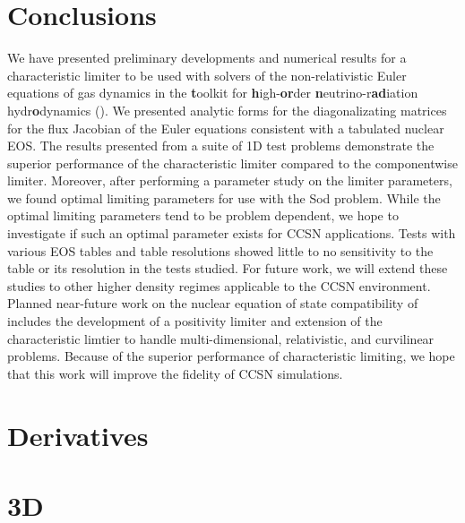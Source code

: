 \documentclass[onecolumn]{aastex62}
\begin{document}
\section{Conclusions}

We have presented preliminary developments and numerical results for a
characteristic limiter to be used with solvers of the non-relativistic
Euler equations of gas dynamics in the {\bf t}oolkit for {\bf h}igh-{\bf or}der
{\bf n}eutrino-r{\bf ad}iation hydr{\bf o}dynamics (\thornado). We presented analytic
forms for the diagonalizating matrices for the flux Jacobian of the Euler equations
consistent with a tabulated nuclear EOS.
The results presented from a suite of 1D test problems
demonstrate the superior performance of the characteristic limiter
compared to the componentwise limiter. Moreover, after performing a parameter
study on the limiter parameters, we found optimal limiting
parameters for use with the Sod problem. While the optimal limiting parameters
tend to be problem dependent, we hope to investigate if such an optimal
parameter exists for CCSN applications. Tests with various EOS tables and
table resolutions showed little to no sensitivity to the table or its
resolution in the tests studied. For future work, we will extend these studies
to other higher density regimes applicable to the CCSN environment.
Planned near-future work on the nuclear equation of state compatibility of
\thornado\, includes the development of a positivity limiter and extension of
the characteristic limtier to handle multi-dimensional, relativistic, and curvilinear problems.
Because of the superior performance of characteristic limiting, we hope that
this work will improve the fidelity of CCSN simulations.



\appendix

\section{Derivatives}
\label{appendix:deriv}


\section{3D}
\label{appendix:3d}




\end{document}
